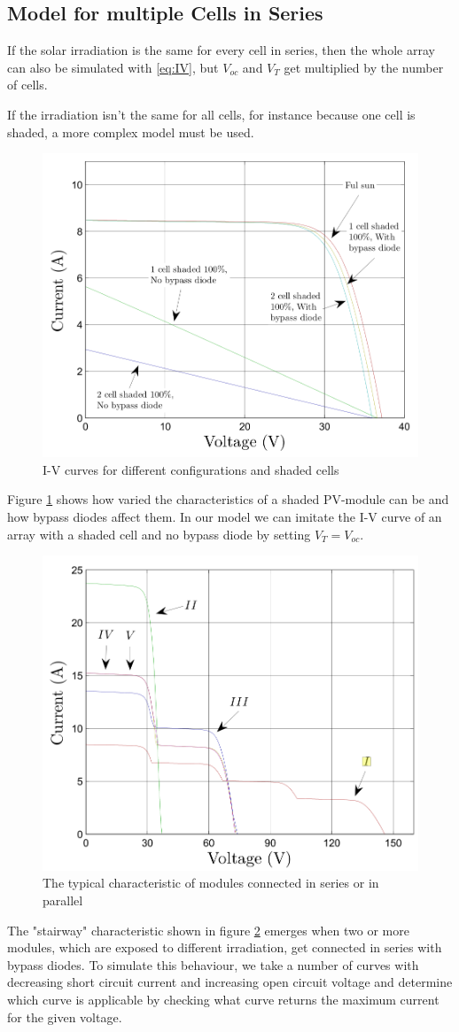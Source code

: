\subsection{Model for multiple Cells in Series}

If  the  solar irradiation is the same for every cell in series, then the  whole
array  can  also  be  simulated  with  \eqref{eq:IV}, but $V_{oc}$ and $V_T$ get
multiplied by the number of cells.

If  the  irradiation isn't the same for all cells, for instance because one cell
is shaded, a more complex model must be used.
\begin{figure}[h]
	\center
    \includegraphics[width=.5\textwidth]{images/model/shaded.png}
    \caption{I-V curves for different configurations and shaded cells\cite{ref:tian:model}}
    \label{fig:model:shaded}
\end{figure}

Figure \ref{fig:model:shaded} shows how  varied  the characteristics of a shaded
PV-module can be and how bypass diodes affect them. In our model  we can imitate
the I-V curve of an array with a shaded cell and no bypass diode by setting $V_T
= V_{oc}$.

\begin{figure}[h]
	\center
    \includegraphics[width=.5\textwidth]{images/model/steps.png}
    \caption{The typical characteristic of modules connected in series or in parallel}
    \label{fig:model:steps}
\end{figure}
The "stairway"  characteristic shown  in  figure \ref{fig:model:steps}
emerges  when  two or more modules, which are exposed to different  irradiation,
get connected in series with bypass diodes. To simulate this behaviour,  we take
a  number of curves with decreasing short circuit current  and  increasing  open
circuit  voltage  and determine which curve is applicable by checking what curve
returns the maximum current for the given voltage.


